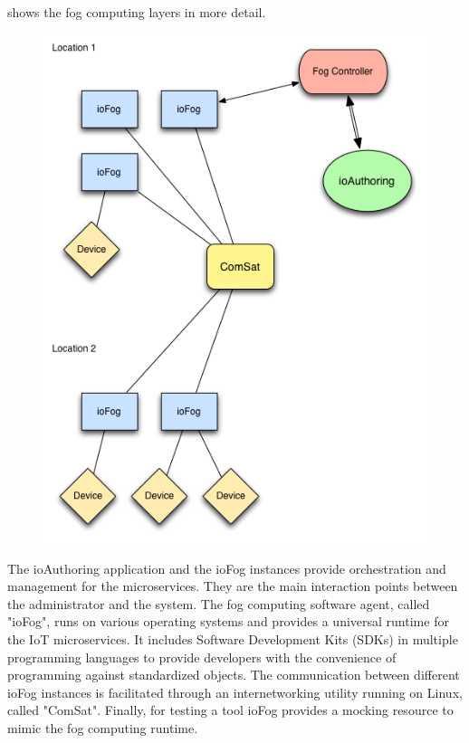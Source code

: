  shows the fog computing layers in more detail.
\begin{figure}[!ht]
    \centering
    \includegraphics[scale=0.45]{figures/ioFog-Component_Diagram.png}
    \label{fig:ioFogComponent}
\end{figure}

The ioAuthoring application and the ioFog instances provide orchestration and management for the microservices. They are the main interaction points between the administrator and the system.
The fog computing software agent, called "ioFog", runs on various operating systems and provides a universal runtime for the IoT microservices. It includes Software Development Kits (SDKs) in multiple programming languages to provide developers with the convenience of programming against standardized objects. The communication between different ioFog instances is facilitated through an internetworking utility running on Linux, called "ComSat". Finally, for testing a tool ioFog provides a mocking resource to mimic the fog computing runtime.

